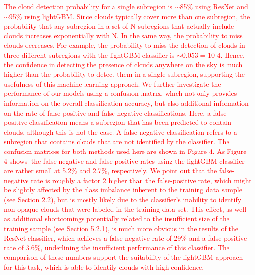 \documentclass[amt, article]{copernicus}
\begin{document}
\textcolor{red}{The cloud detection probability for a single subregion is
$\sim$85\% using ResNet and $\sim$95\% using lightGBM. Since clouds
typically cover more than one subregion, the probability that
any subregion in a set of N subregions that actually include
clouds increases exponentially with N. In the same way, the
probability to miss clouds decreases. For example, the
probability to miss the detection of clouds in three different
subregions with the lightGBM classifier is $\sim$0.053 = 10-4.
Hence, the confidence in detecting the presence of clouds
anywhere on the sky is much higher than the probability to
detect them in a single subregion, supporting the usefulness of
this machine-learning approach.
We further investigate the performance of our models using
a confusion matrix, which not only provides information on the
overall classification accuracy, but also additional information
on the rate of false-positive and false-negative classifications.
Here, a false-positive classification means a subregion that has
been predicted to contain clouds, although this is not the case.
A false-negative classification refers to a subregion that
contains clouds that are not identified by the classifier. The
confusion matrices for both methods used here are shown in
Figure 4.
As Figure 4 shows, the false-negative and false-positive rates
using the lightGBM classifier are rather small at 5.2\% and
2.7\%, respectively. We point out that the false-negative rate is
roughly a factor 2 higher than the false-positive rate, which
might be slightly affected by the class imbalance inherent to the
training data sample (see Section 2.2), but is mostly likely due
to the classifier’s inability to identify non-opaque clouds that
were labeled in the training data set. This effect, as well as
additional shortcomings potentially related to the insufficient
size of the training sample (see Section 5.2.1), is much more
obvious in the results of the ResNet classifier, which achieves a
false-negative rate of 29\% and a false-positive rate of 3.6\%,
underlining the insufficient performance of this classifier. The
comparison of these numbers support the suitability of the
lightGBM approach for this task, which is able to identify
clouds with high confidence.}
\end{document}
